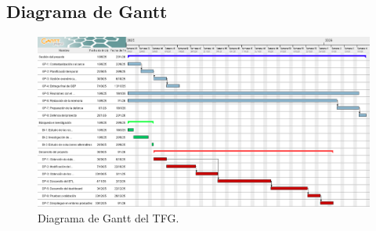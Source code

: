 \begin{landscape}
\subsection{Diagrama de Gantt}

\graphicspath{ {Diagrama de Gantt/figures/} }

\begin{figure}[!ht]
    \centering
    \includegraphics[height=0.8\textheight,keepaspectratio]{TFG-Gantt.png}
    \caption{Diagrama de Gantt del TFG.}
    \label{fig:gantt}
\end{figure}

\end{landscape}